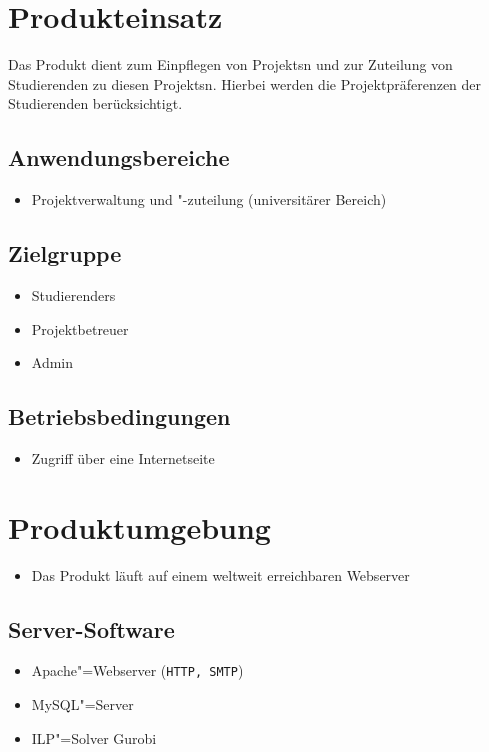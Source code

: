 \documentclass[parskip=full]{scrartcl}
\begin{document}
\section{Produkteinsatz}
Das Produkt dient zum Einpflegen von \glspl{Projekt}n und zur Zuteilung von
Studierenden zu diesen \glspl{Projekt}n. Hierbei werden die Projektpräferenzen der
Studierenden berücksichtigt.


\subsection{Anwendungsbereiche}

\begin{itemize} 
  \item Projektverwaltung und "-zuteilung (universitärer Bereich) %
\end{itemize}

\subsection{Zielgruppe}
\begin{itemize} 
  \item \glspl{Studierender}
  \item \gls{Projektbetreuer}
  \item \gls{Admin}
\end{itemize}

\subsection{Betriebsbedingungen}
\begin{itemize} 
  \item Zugriff über eine Internetseite
\end{itemize}
\section{Produktumgebung}

\begin{itemize} 
  \item Das Produkt läuft auf einem weltweit erreichbaren Webserver
\end{itemize}
\subsection{Server-Software}
\begin{itemize} 
  \item Apache"=Webserver (\texttt{HTTP, SMTP})
  \item MySQL"=Server
  \item ILP"=Solver Gurobi %
\end{itemize}
\end{document}
